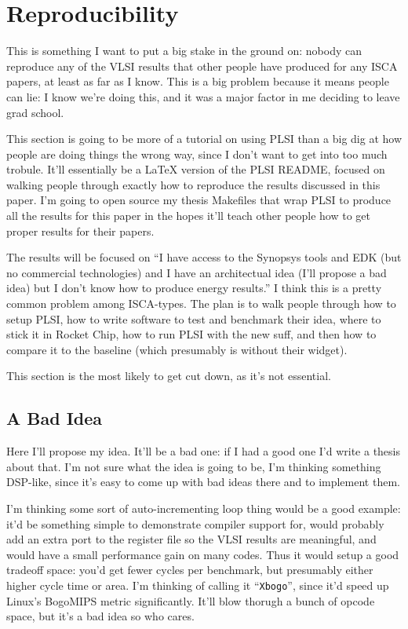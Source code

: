 \documentclass{article}
\begin{document}
\chapter{Reproducibility}

This is something I want to put a big stake in the ground on: nobody can
reproduce any of the VLSI results that other people have produced for any ISCA
papers, at least as far as I know.  This is a big problem because it means
people can lie: I know we're doing this, and it was a major factor in me
deciding to leave grad school.

This section is going to be more of a tutorial on using PLSI than a big dig at
how people are doing things the wrong way, since I don't want to get into too
much trobule.  It'll essentially be a LaTeX version of the PLSI README, focused
on walking people through exactly how to reproduce the results discussed in
this paper.  I'm going to open source my thesis Makefiles that wrap PLSI to
produce all the results for this paper in the hopes it'll teach other people
how to get proper results for their papers.

The results will be focused on ``I have access to the Synopsys tools and EDK
(but no commercial technologies) and I have an architectual idea (I'll propose
a bad idea) but I don't know how to produce energy results.''  I think this is
a pretty common problem among ISCA-types.  The plan is to walk people through
how to setup PLSI, how to write software to test and benchmark their idea,
where to stick it in Rocket Chip, how to run PLSI with the new suff, and then
how to compare it to the baseline (which presumably is without their widget).

This section is the most likely to get cut down, as it's not essential.

\section{A Bad Idea}

Here I'll propose my idea.  It'll be a bad one: if I had a good one I'd write a
thesis about that.  I'm not sure what the idea is going to be, I'm thinking
something DSP-like, since it's easy to come up with bad ideas there and to
implement them.

I'm thinking some sort of auto-incrementing loop thing would be a good example:
it'd be something simple to demonstrate compiler support for, would probably
add an extra port to the register file so the VLSI results are meaningful, and
would have a small performance gain on many codes.  Thus it would setup a good
tradeoff space: you'd get fewer cycles per benchmark, but presumably either
higher cycle time or area.  I'm thinking of calling it ``\texttt{Xbogo}'', since
it'd speed up Linux's BogoMIPS metric significantly.  It'll blow thorugh a
bunch of opcode space, but it's a bad idea so who cares.
\end{document}
